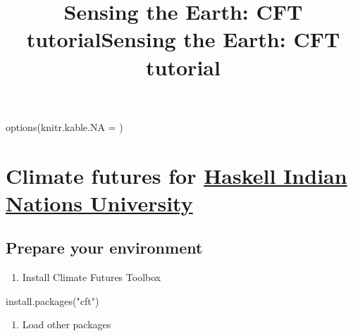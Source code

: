 \documentclass[
  paper=a4,
  ,captions=tableheading
]{scrartcl}
\title{Sensing the Earth: CFT tutorial}
\author{}
\date{}
\title{Sensing the Earth: CFT tutorial}
\author{}
\date{}
\newenvironment{Shaded}{\begin{snugshade}}{\end{snugshade}}
\newcommand{\AttributeTok}[1]{\textcolor[rgb]{0.77,0.63,0.00}{#1}}
\newcommand{\FunctionTok}[1]{\textcolor[rgb]{0.00,0.00,0.00}{#1}}
\newcommand{\NormalTok}[1]{#1}
\newcommand{\StringTok}[1]{\textcolor[rgb]{0.31,0.60,0.02}{#1}}
\providecommand{\tightlist}{%
  \setlength{\itemsep}{0pt}\setlength{\parskip}{0pt}}
\begin{document}




{
\setcounter{tocdepth}{2}
\tableofcontents
}
\let\oldsection\section
\renewcommand\section{\clearpage\oldsection}

\begin{Shaded}
\begin{Highlighting}[]
\FunctionTok{options}\NormalTok{(}\AttributeTok{knitr.kable.NA =} \StringTok{\textquotesingle{}\textquotesingle{}}\NormalTok{)}
\end{Highlighting}
\end{Shaded}

\hypertarget{climate-futures-for-haskell-indian-nations-university}{%
\section{\texorpdfstring{Climate futures for
\href{https://www.haskell.edu}{Haskell Indian Nations
University}}{Climate futures for Haskell Indian Nations University}}\label{climate-futures-for-haskell-indian-nations-university}}

\hypertarget{prepare-your-environment}{%
\subsection{Prepare your environment}\label{prepare-your-environment}}

\begin{enumerate}
\def\labelenumi{\arabic{enumi}.}
\tightlist
\item
  Install Climate Futures Toolbox
\end{enumerate}

\begin{Shaded}
\begin{Highlighting}[]
\FunctionTok{install.packages}\NormalTok{(}\StringTok{"cft"}\NormalTok{)}
\end{Highlighting}
\end{Shaded}

\begin{enumerate}
\def\labelenumi{\arabic{enumi}.}
\setcounter{enumi}{1}
\tightlist
\item
  Load other packages
\end{enumerate}
\end{document}
